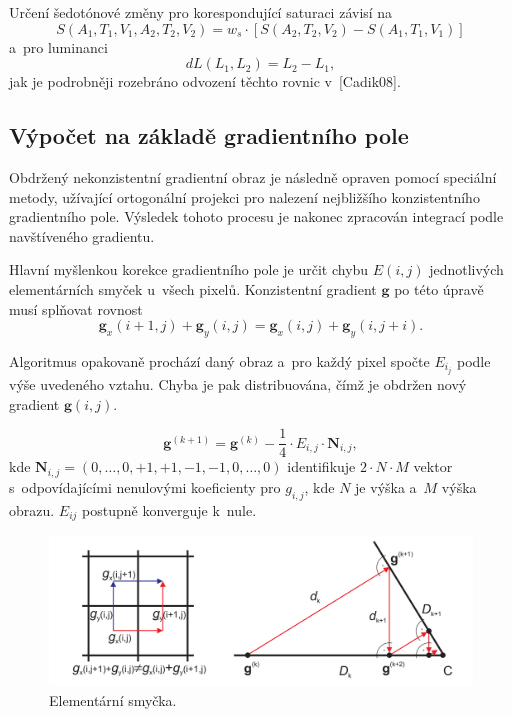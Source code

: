 \documentclass[11pt,a4paper,oneside]{article}
\begin{document}
	Určení šedotónové změny pro korespondující saturaci závisí na
	\begin{equation}
		S(A_1, T_1, V_1, A_2, T_2, V_2) = w_s \cdot \left[S(A_2, T_2, V_2) - S(A_1, T_1, V_1)\right]
		\label{eq:sat}
	\end{equation}
	a~pro luminanci
	\begin{equation}
		dL(L_1, L_2) = L_2 - L_1,
		\label{eq:lum}
	\end{equation}
	jak je podrobněji rozebráno odvození těchto rovnic v~[Cadik08].

	\subsection{Výpočet na základě gradientního pole}
	Obdržený nekonzistentní gradientní obraz je následně opraven pomocí speciální metody, užívající
	ortogonální projekci pro nalezení nejbližšího konzistentního gradientního pole. Výsledek
	tohoto procesu je nakonec zpracován integrací podle navštíveného gradientu.

	Hlavní myšlenkou korekce gradientního pole je určit chybu $E(i, j)$ jednotlivých elementárních smyček
	u~všech pixelů. Konzistentní gradient $\mathbf{g}$ po této úpravě musí splňovat rovnost
	$$
		\mathbf{g}_x(i + 1, j) + \mathbf{g}_y(i, j) = \mathbf{g}_x(i, j) + \mathbf{g}_y(i, j + i).
	$$

	Algoritmus opakovaně prochází daný obraz a~pro každý pixel spočte $E_{i_j}$ podle výše uvedeného
	vztahu. Chyba je pak distribuována, čímž je obdržen nový gradient $\mathbf{g}(i, j)$.

	\begin{equation}
		\mathbf{g}^{(k + 1)} = \mathbf{g}^{(k)} - \frac{1}{4} \cdot E_{i,j} \cdot \mathbf{N}_{i,j},
	\end{equation}
	kde $\mathbf{N}_{i,j} = (0, \dots, 0, +1, +1, -1, -1, 0, \dots, 0)$ identifikuje $2 \cdot
	N \cdot M$ vektor s~odpovídajícími nenulovými koeficienty pro $g_{i,j}$, kde $N$
	je výška a~$M$ výška obrazu. $E_{ij}$ postupně konverguje k~nule.

	\begin{figure}[htb]
		\centering
		\includegraphics[width=\linewidth,keepaspectratio]{fig/grad.png}
		\caption{Elementární smyčka.} 
		\label{fig:grad}
	\end{figure}
\end{document}
